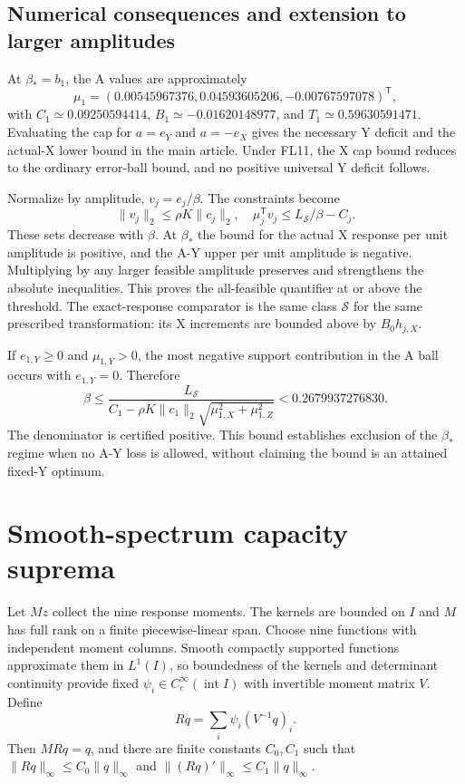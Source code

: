 \documentclass[9pt]{osa-supplemental-document}
\begin{document}
\subsection{Numerical consequences and extension to larger amplitudes}
At $\beta_*=b_1$, the A values are approximately
\begin{equation}
 \mu_1=(0.00545967376,0.04593605206,-0.00767597078)^{\mathsf T},
\end{equation}
with $C_1\simeq0.09250594414$, $B_1\simeq-0.01620148977$, and $T_1\simeq0.59630591471$. Evaluating the cap for $a=e_Y$ and $a=-e_X$ gives the necessary Y deficit and the actual-X lower bound in the main article. Under FL11, the X cap bound reduces to the ordinary error-ball bound, and no positive universal Y deficit follows.

Normalize by amplitude, $v_j=e_j/\beta$. The constraints become
\begin{equation}
 \|v_j\|_2\leq\rho K\|c_j\|_2,\quad
 \mu_j^{\mathsf T}v_j\leq L_{\mathcal S}/\beta-C_j.
\end{equation}
These sets decrease with $\beta$. At $\beta_*$ the bound for the actual X response per unit amplitude is positive, and the A-Y upper per unit amplitude is negative. Multiplying by any larger feasible amplitude preserves and strengthens the absolute inequalities. This proves the all-feasible quantifier at or above the threshold. The exact-response comparator is the same class $\mathcal S$ for the same prescribed transformation: its X increments are bounded above by $B_0h_{j,X}$.

If $e_{1,Y}\geq0$ and $\mu_{1,Y}>0$, the most negative support contribution in the A ball occurs with $e_{1,Y}=0$. Therefore
\begin{equation}
 \beta\leq\frac{L_{\mathcal S}}
 {C_1-\rho K\|c_1\|_2\sqrt{\mu_{1,X}^2+\mu_{1,Z}^2}}
 <0.2679937276830.
\end{equation}
The denominator is certified positive. This bound establishes exclusion of the $\beta_*$ regime when no A-Y loss is allowed, without claiming the bound is an attained fixed-Y optimum.

\section{Smooth-spectrum capacity suprema}
Let $Mz$ collect the nine response moments. The kernels are bounded on $I$ and $M$ has full rank on a finite piecewise-linear span. Choose nine functions with independent moment columns. Smooth compactly supported functions approximate them in $L^1(I)$, so boundedness of the kernels and determinant continuity provide fixed $\psi_i\in C_c^\infty(\operatorname{int}I)$ with invertible moment matrix $V$. Define
\begin{equation}
 Rq=\sum_i\psi_i(V^{-1}q)_i.
\end{equation}
Then $MRq=q$, and there are finite constants $C_0,C_1$ such that $\|Rq\|_\infty\leq C_0\|q\|_\infty$ and $\|(Rq)'\|_\infty\leq C_1\|q\|_\infty$.
\end{document}
